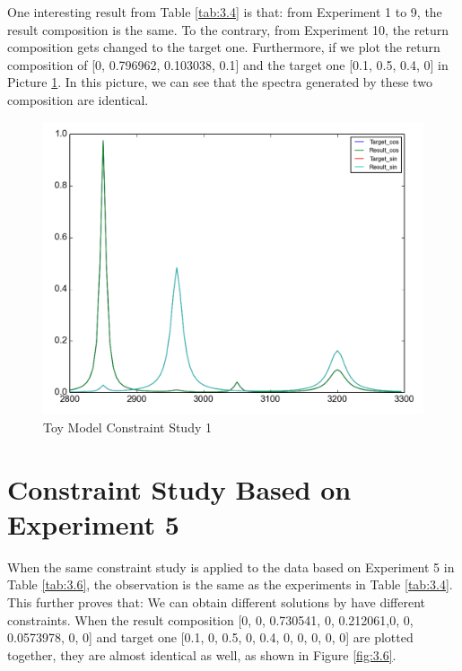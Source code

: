 One interesting result from Table \ref{tab:3.4} is that: from Experiment 1 to 9, the result composition is the same. To the contrary, from Experiment 10, the return composition gets changed to the target one. Furthermore, if we plot the return composition of [0, 0.796962, 0.103038, 0.1] and the target one [0.1, 0.5, 0.4, 0] in  Picture \ref{fig:3.5}. In this picture, we can see that the spectra generated by these two composition are identical.

\begin{figure}[!ht] \label{fig:3.5}
\centering
\includegraphics[scale=0.3]{Figures/toy_model_result_plotting_ir_sin_4candi_constraint_study_experiment4.png} 
\caption{Toy Model Constraint Study 1}
\end{figure}


\section{Constraint Study Based on Experiment 5}

When the same constraint study is applied to the data based on Experiment 5 in Table \ref{tab:3.6}, the observation is the same as the experiments in Table \ref{tab:3.4}. This further proves that: We can obtain different solutions by have different constraints. When the  result composition [0, 0, 0.730541, 0, 0.212061,0, 0, 0.0573978, 0, 0] and target one [0.1, 0, 0.5, 0, 0.4, 0, 0, 0, 0, 0] are plotted together, they are almost identical as well, as shown in Figure \ref{fig:3.6}.

